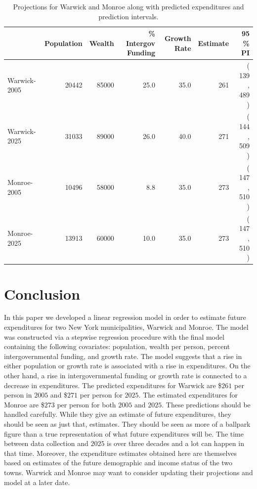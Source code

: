 \documentclass{article}\usepackage[]{graphicx}\usepackage[]{color}
\begin{document}
\begin{table}[ht]
\centering
\begin{tabular}{|l|rrrrrr|}
  \hline
 & Population & Wealth & \% Intergov Funding & Growth Rate & Estimate & 95 \% PI \\ 
  \hline
Warwick-2005 & 20442 & 85000 & 25.0 & 35.0 & 261 & ( 139 , 489 ) \\ 
  Warwick-2025  & 31033 & 89000 & 26.0 & 40.0 & 271 & ( 144 , 509 ) \\ 
  Monroe-2005 & 10496 & 58000 & 8.8 & 35.0 & 273 & ( 147 , 510 ) \\ 
  Monroe-2025 & 13913 & 60000 & 10.0 & 35.0 & 273 & ( 147 , 510 ) \\ 
   \hline
\end{tabular}
\caption{Projections for Warwick and Monroe along with predicted expenditures and prediction intervals.} 
\label{tbl:pred}
\end{table}




\section{Conclusion} \label{conclusion}

In this paper we developed a linear regression model in order to estimate future expenditures for two New York municipalities, Warwick and Monroe. The model was constructed via a stepwise regression procedure with the final model containing the following covariates: population, wealth per person, percent intergovernmental funding, and growth rate. The model suggests that a rise in either population or growth rate is associated with a rise in expenditures. On the other hand, a rise in intergovernmental funding or growth rate is connected to a decrease in expenditures. The predicted expenditures for Warwick are \$$261$ per person in $2005$ and \$$271$ per person for $2025$. The estimated expenditures for Monroe are \$$273$ per person for both $2005$ and $2025$. These predictions should be handled carefully. While they give an estimate of future expenditures, they should be seen as just that, estimates. They should be seen as more of a ballpark figure than a true representation of what future expenditures will be. The time between data collection and $2025$ is over three decades and a lot can happen in that time. Moreover, the expenditure estimates obtained here are themselves based on estimates of the future demographic and income status of the two towns. Warwick and Monroe may want to consider updating their projections and model at a later date.
\end{document}
